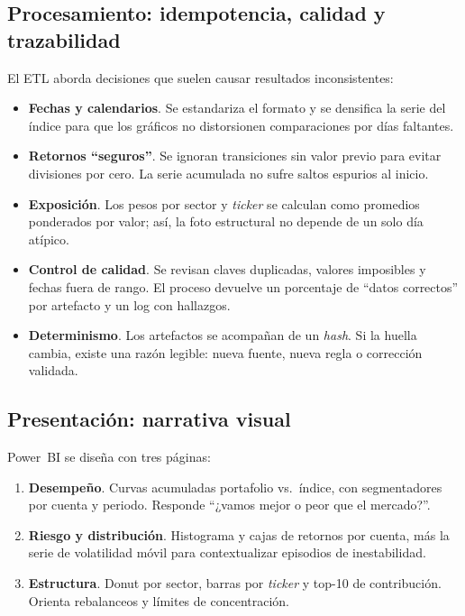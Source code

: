 \documentclass[conference]{IEEEtran}
\begin{document}
\subsection{Procesamiento: idempotencia, calidad y trazabilidad}
El ETL aborda decisiones que suelen causar resultados inconsistentes:
\begin{itemize}
  \item \textbf{Fechas y calendarios}. Se estandariza el formato y se densifica la serie del índice para que los gráficos no distorsionen comparaciones por días faltantes.
  \item \textbf{Retornos “seguros”}. Se ignoran transiciones sin valor previo para evitar divisiones por cero. La serie acumulada no sufre saltos espurios al inicio.
  \item \textbf{Exposición}. Los pesos por sector y \emph{ticker} se calculan como promedios ponderados por valor; así, la foto estructural no depende de un solo día atípico.
  \item \textbf{Control de calidad}. Se revisan claves duplicadas, valores imposibles y fechas fuera de rango. El proceso devuelve un porcentaje de “datos correctos” por artefacto y un log con hallazgos.
  \item \textbf{Determinismo}. Los artefactos se acompañan de un \emph{hash}. Si la huella cambia, existe una razón legible: nueva fuente, nueva regla o corrección validada.
\end{itemize}

\subsection{Presentación: narrativa visual}
Power~BI se diseña con tres páginas:
\begin{enumerate}
  \item \textbf{Desempeño}. Curvas acumuladas portafolio vs.\ índice, con segmentadores por cuenta y periodo. Responde “¿vamos mejor o peor que el mercado?”.
  \item \textbf{Riesgo y distribución}. Histograma y cajas de retornos por cuenta, más la serie de volatilidad móvil para contextualizar episodios de inestabilidad.
  \item \textbf{Estructura}. Donut por sector, barras por \emph{ticker} y top-10 de contribución. Orienta rebalanceos y límites de concentración.
\end{enumerate}
\end{document}
